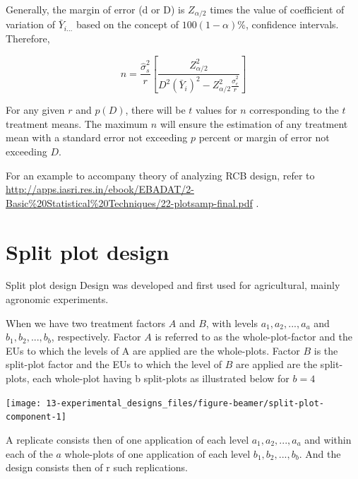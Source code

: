 \documentclass[
  ignorenonframetext,
  aspectratio=169]{beamer}
\begin{document}
\begin{frame}{}
\protect\hypertarget{section-12}{}
Generally, the margin of error (d or D) is \(Z_{\alpha/2}\) times the
value of coefficient of variation of \(\bar{Y}_{i...}\) based on the
concept of \(100(1-\alpha)\%\), confidence intervals. Therefore,

\[
n = \frac{\hat{\sigma}_s^2}{r} \left[\frac{Z_{\alpha/2}^2}{D^2 (\bar{Y}_i)^2 - Z_{\alpha/2}^2 \frac{\hat{\sigma}_e^2}{r}} \right]
\]

For any given \(r\) and \(p(D)\), there will be \(t\) values for \(n\)
corresponding to the \(t\) treatment means. The maximum \(n\) will
ensure the estimation of any treatment mean with a standard error not
exceeding \(p\) percent or margin of error not exceeding \(D\).

For an example to accompany theory of analyzing RCB design, refer to
\url{http://apps.iasri.res.in/ebook/EBADAT/2-Basic\%20Statistical\%20Techniques/22-plotsamp-final.pdf}
.
\end{frame}

\hypertarget{split-plot-design}{%
\section{Split plot design}\label{split-plot-design}}

\begin{frame}{Split plot design}
\protect\hypertarget{split-plot-design-1}{}
Design was developed and first used for agricultural, mainly agronomic
experiments.

When we have two treatment factors \(A\) and \(B\), with levels
\(a_1, a_2, ..., a_a\) and \(b_1, b_2, ..., b_b\), respectively. Factor
\(A\) is referred to as the whole-plot-factor and the EUs to which the
levels of A are applied are the whole-plots. Factor \(B\) is the
split-plot factor and the EUs to which the level of \(B\) are applied
are the split-plots, each whole-plot having b split-plots as illustrated
below for \(b = 4\)

\begin{center}\texttt{[image: 13-experimental\_designs\_files/figure-beamer/split-plot-component-1]} \end{center}

A replicate consists then of one application of each level
\(a_1, a_2, ..., a_a\) and within each of the \(a\) whole-plots of one
application of each level \(b_1, b_2, ..., b_b\). And the design
consists then of r such replications.
\end{frame}
\end{document}
